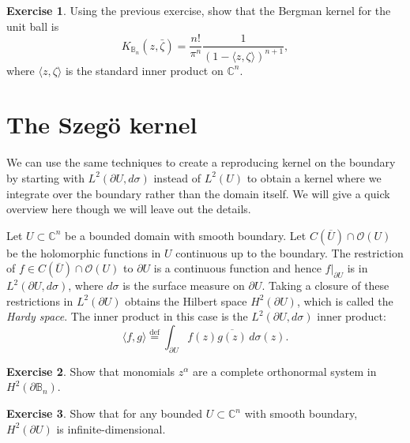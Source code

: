 \documentclass[12pt,openany]{book}
\newcommand{\linnprod}[2]{\langle #1 , #2 \rangle}
\newcommand{\C}{{\mathbb{C}}}
\newcommand{\bB}{{\mathbb{B}}}
\newcommand{\sO}{{\mathscr{O}}}
\newcommand{\myindex}[1]{#1\index{#1}}
\theoremstyle{plain}
\theoremstyle{remark}
\theoremstyle{definition}
\newenvironment{exbox}{%
    \def\FrameCommand{\vrule width 1pt \relax\hspace {10pt}}%
    \MakeFramed {\advance \hsize -\width \FrameRestore }%
}{%
    \endMakeFramed
}
\theoremstyle{exercise}
\newtheorem{exercise}{Exercise}[section]
\theoremstyle{example}
\begin{document}
\begin{exbox}
\begin{exercise}
Using the previous exercise, show that the Bergman kernel for the unit ball
is
\begin{equation*}
K_{\bB_n}(z,\bar{\zeta}) =
\frac{n!}{\pi^n}\frac{1}{{(1-\linnprod{z}{\zeta})}^{n+1}},
\end{equation*}
where $\linnprod{z}{\zeta}$ is the standard inner product on $\C^n$.
\end{exercise}
\end{exbox}


\section{The Szeg{\"o} kernel}

We can use the same techniques to create a reproducing kernel on the
boundary by starting with $L^2(\partial U, d\sigma)$ instead of $L^2(U)$ to obtain a
kernel where we integrate over the boundary rather than the domain itself.
We will give a quick overview here though we will leave out the details.

Let $U \subset \C^n$ be a bounded domain with smooth boundary.  Let
$C(\overline{U}) \cap \sO(U)$ be the holomorphic functions in $U$
continuous up to the boundary.  The restriction of
$f \in C(\overline{U}) \cap \sO(U)$ to $\partial U$ is a continuous function
and hence $f|_{\partial U}$ is in $L^2(\partial U,d\sigma)$, where $d\sigma$
is the surface measure on $\partial U$.  Taking a closure
of these restrictions in $L^2(\partial U)$ obtains the Hilbert space
$H^2(\partial U)$,
%
which is called the \emph{\myindex{Hardy space}}.
The inner product in this case is the $L^2(\partial U,
d\sigma)$ inner product:
\begin{equation*}
\linnprod{f}{g} \overset{\text{def}}{=} \int_{\partial U} f(z)
\overline{g(z)} \, d\sigma(z) .
\end{equation*}

\begin{exbox}
\begin{exercise}
Show that monomials $z^\alpha$ are a complete orthonormal system in
$H^2(\partial \bB_n)$.
\end{exercise}

\begin{exercise}
Show that for any bounded $U \subset \C^n$ with smooth boundary,
$H^2(\partial U)$ is infinite-dimensional.
\end{exercise}
\end{exbox}
\end{document}
